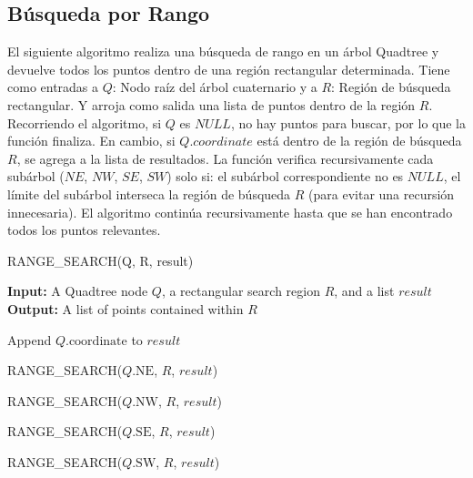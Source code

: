 \documentclass[9pt,a4paper,twoside]{rho-class/rho}
\begin{document}
        \subsection{Búsqueda por Rango}
            El siguiente algoritmo realiza una búsqueda de rango en un árbol Quadtree y devuelve todos los puntos dentro de una región rectangular determinada. Tiene como entradas a $Q$: Nodo raíz del árbol cuaternario y a $R$: Región de búsqueda rectangular. Y arroja como salida una lista de puntos dentro de la región $R$.
            Recorriendo el algoritmo, si $Q$ es $NULL$, no hay puntos para buscar, por lo que la función finaliza. En cambio, si $Q.coordinate$ está dentro de la región de búsqueda $R$, se agrega a la lista de resultados. La función verifica recursivamente cada subárbol ($NE$, $NW$, $SE$, $SW$) solo si: el subárbol correspondiente no es $NULL$, el límite del subárbol interseca la región de búsqueda $R$ (para evitar una recursión innecesaria). El algoritmo continúa recursivamente hasta que se han encontrado todos los puntos relevantes.\cite{samet_spatial_structures}
            \begin{algorithm}
                \caption{RANGE\_SEARCH(Q, R, result)}
                \begin{algorithmic}[1]
                    \Statex \textbf{Input:} A Quadtree node $Q$, a rectangular search region $R$, and a list $result$
                    \Statex \textbf{Output:} A list of points contained within $R$
                    
                        \State \Return {}
                    \EndIf
                    
                        \State Append $Q.\text{coordinate}$ to $result$ 
                    \EndIf
                    
                        \State RANGE\_SEARCH($Q.\text{NE}$, $R$, $result$)
                    \EndIf
                    
                        \State RANGE\_SEARCH($Q.\text{NW}$, $R$, $result$)
                    \EndIf
                    
                        \State RANGE\_SEARCH($Q.\text{SE}$, $R$, $result$)
                    \EndIf
                    
                        \State RANGE\_SEARCH($Q.\text{SW}$, $R$, $result$)
                    \EndIf
                    
                    \State \Return {}
                
                \end{algorithmic}
            \end{algorithm}
\end{document}
